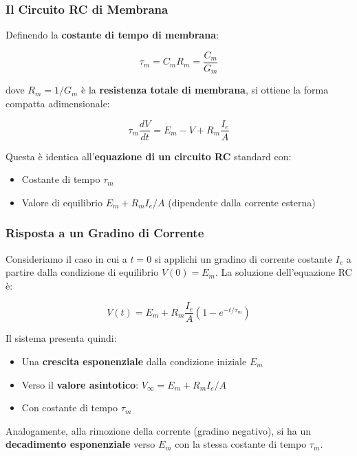 \subsubsection{Il Circuito RC di Membrana}

Definendo la \textbf{costante di tempo di membrana}:

\begin{equation}
\tau_m = C_m R_m = \frac{C_m}{G_m}
\end{equation}

dove $R_m = 1/G_m$ è la \textbf{resistenza totale di membrana}, si ottiene la forma compatta adimensionale:

\begin{equation}
\tau_m \frac{dV}{dt} = E_m - V + R_m \frac{I_e}{A}
\end{equation}

Questa è identica all'\textbf{equazione di un circuito RC} standard con:
\begin{itemize}
    \item Costante di tempo $\tau_m$
    \item Valore di equilibrio $E_m + R_m I_e/A$ (dipendente dalla corrente esterna)
\end{itemize}


\subsubsection{Risposta a un Gradino di Corrente}

Consideriamo il caso in cui a $t = 0$ si applichi un gradino di corrente costante $I_e$ a partire dalla condizione di equilibrio $V(0) = E_m$. La soluzione dell'equazione RC è:

\begin{equation}
V(t) = E_m + R_m \frac{I_e}{A}\left(1 - e^{-t/\tau_m}\right)
\end{equation}

Il sistema presenta quindi:
\begin{itemize}
    \item Una \textbf{crescita esponenziale} dalla condizione iniziale $E_m$
    \item Verso il \textbf{valore asintotico}: $V_\infty = E_m + R_m I_e/A$
    \item Con costante di tempo $\tau_m$
\end{itemize}

Analogamente, alla rimozione della corrente (gradino negativo), si ha un \textbf{decadimento esponenziale} verso $E_m$ con la stessa costante di tempo $\tau_m$.

